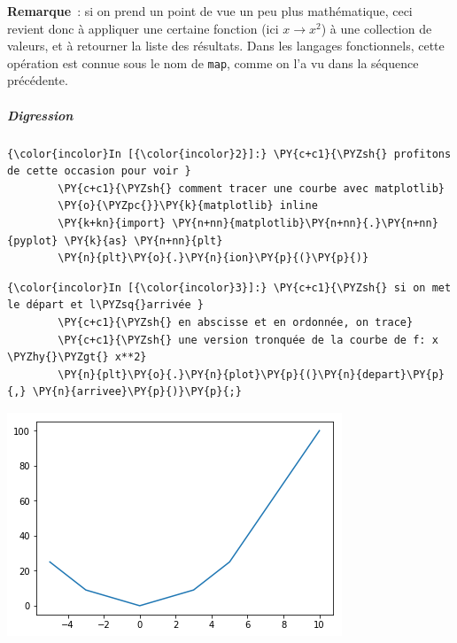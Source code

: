    \textbf{Remarque}~: si on prend un point de vue un peu plus
mathématique, ceci revient donc à appliquer une certaine fonction (ici
\(x \rightarrow x^2\)) à une collection de valeurs, et à retourner la
liste des résultats. Dans les langages fonctionnels, cette opération est
connue sous le nom de \texttt{map}, comme on l'a vu dans la séquence
précédente.

    \hypertarget{digression}{%
\subparagraph{Digression}\label{digression}}

    \begin{Verbatim}[commandchars=\\\{\}]
{\color{incolor}In [{\color{incolor}2}]:} \PY{c+c1}{\PYZsh{} profitons de cette occasion pour voir }
        \PY{c+c1}{\PYZsh{} comment tracer une courbe avec matplotlib}
        \PY{o}{\PYZpc{}}\PY{k}{matplotlib} inline
        \PY{k+kn}{import} \PY{n+nn}{matplotlib}\PY{n+nn}{.}\PY{n+nn}{pyplot} \PY{k}{as} \PY{n+nn}{plt}
        \PY{n}{plt}\PY{o}{.}\PY{n}{ion}\PY{p}{(}\PY{p}{)}
\end{Verbatim}


    \begin{Verbatim}[commandchars=\\\{\}]
{\color{incolor}In [{\color{incolor}3}]:} \PY{c+c1}{\PYZsh{} si on met le départ et l\PYZsq{}arrivée }
        \PY{c+c1}{\PYZsh{} en abscisse et en ordonnée, on trace}
        \PY{c+c1}{\PYZsh{} une version tronquée de la courbe de f: x \PYZhy{}\PYZgt{} x**2}
        \PY{n}{plt}\PY{o}{.}\PY{n}{plot}\PY{p}{(}\PY{n}{depart}\PY{p}{,} \PY{n}{arrivee}\PY{p}{)}\PY{p}{;}
\end{Verbatim}


    \begin{center}
 	\includegraphics{medias/output_11_0.png}  
    \end{center}
    { \hspace*{\fill} \\}
 

